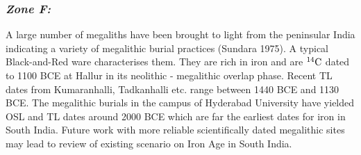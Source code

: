 

\vspace{-.3cm}

\subsubsection*{\textit{Zone F:}}

\vspace{-.2cm}

A large number of megaliths have been brought to light from the peninsular India indicating a variety of megalithic burial practices (Sundara 1975). A typical Black-and-Red ware characterises them. They are rich in iron and are $^{14}{\rm C}$ dated to 1100 BCE at Hallur in its neolithic - megalithic overlap phase. Recent TL dates from Kumaranhalli, Tadkanhalli etc. range between 1440 BCE and 1130 BCE. The megalithic burials in the campus of Hyderabad University have yielded OSL and TL dates around 2000 BCE which are far the earliest dates for iron in South India. Future work with more reliable  scientifically  dated megalithic sites may lead to review of existing scenario on Iron Age in South India.

